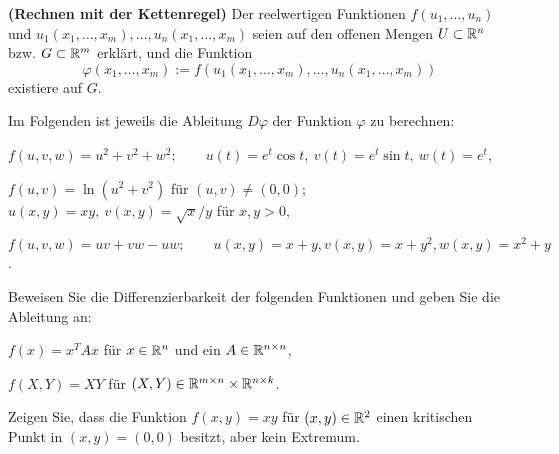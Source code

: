 \begin{Problem}
	\textbf{(Rechnen mit der Kettenregel)} Der reelwertigen Funktionen $f(u_1,\dots, u_n)$ und $u_1(x_1,\dots, x_m),\dots, u_n(x_1,\dots, x_m)$ seien auf den offenen Mengen $U\subset \mathbb{R}^n$ bzw. $G\subset \mathbb{R}^m$ erklärt, und die Funktion
	\[
	\varphi(x_1,\dots, x_m):=f(u_1(x_1,\dots, x_m),\dots, u_n(x_1,\dots, x_m))
\]
existiere auf $G$.

Im Folgenden ist jeweils die Ableitung $D\varphi$ der Funktion $\varphi$ zu berechnen:
\begin{parts}
\item $f(u,v,w)=u^2+v^2+w^2;\qquad u(t)=e^t\cos t,~v(t)=e^t\sin t,~w(t)=e^t$,
\item $f(u,v)=\ln(u^2+v^2)$ f\"{u}r $(u,v)\neq (0,0)$; $u(x,y)=xy,~v(x,y)=\sqrt{x} / y$ f\"{u}r $x,y>0$,
\item $f(u,v,w)=uv+vw-uw;\qquad u(x,y)=x+y,v(x,y)=x+y^2,w(x,y)=x^2+y$.
\end{parts}
\end{Problem}

\begin{Problem}
Beweisen Sie die Differenzierbarkeit der folgenden Funktionen und geben Sie die Ableitung an:	
\begin{parts}
\item $f(x)=x^TAx$ f\"{u}r $x\in \mathbb{R}^n$ und ein $A\in \mathbb{R}^{n\times n}$,
\item $f(X,Y)=XY$ f\"{u}r $(X,Y)\in \mathbb{R}^{m\times n}\times \mathbb{R}^{n\times k}$.
\end{parts}
\end{Problem}

\begin{Problem}
	Zeigen Sie, dass die Funktion $f(x,y)=xy$ f\"{u}r $(x,y)\in \mathbb{R}^2$ einen kritischen Punkt in $(x,y)=(0,0)$ besitzt, aber kein Extremum.
\end{Problem}
